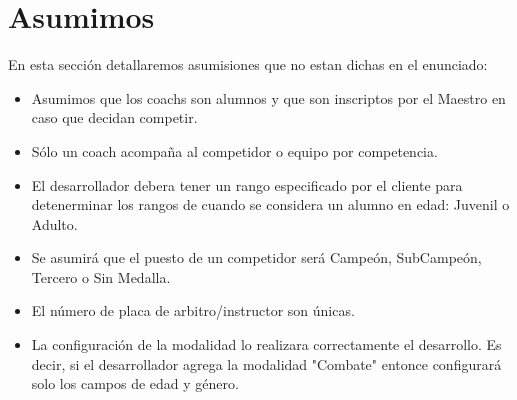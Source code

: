 \section{Asumimos}

En esta secci\'on detallaremos asumisiones que no estan dichas en el enunciado:

\begin{itemize}

\item Asumimos que los coachs son alumnos y que son inscriptos por el Maestro en caso que decidan competir.
\item S\'olo un coach acompaña al competidor o equipo por competencia.
\item El desarrollador debera tener un rango especificado por el cliente para detenerminar los rangos de cuando se considera un alumno en edad: Juvenil o Adulto.
\item Se asumirá que el puesto de un competidor será Campeón, SubCampeón, Tercero o Sin Medalla.
\item El n\'umero de placa de arbitro/instructor son \'unicas.
\item La configuraci\'on de la modalidad lo realizara correctamente el desarrollo. Es decir, si el desarrollador agrega la modalidad "Combate" entonce configurar\'a solo los campos de edad y g\'enero. 

\end{itemize}


